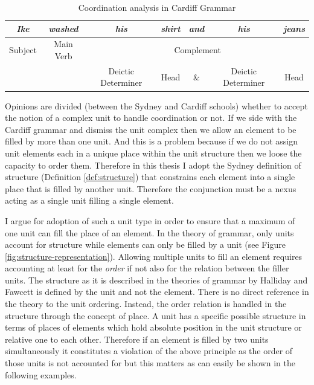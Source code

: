 \begin{table}[!ht]
	\centering
        \begin{tabular}{cc|c|c|c|c|c|}
            \hline
            \multicolumn{1}{|c|}{\textit{Ike}} & \textit{washed} & \textit{his}       & \textit{shirt} & \textit{and} & \textit{his}       & \textit{jeans} \\ \hline
            \multicolumn{1}{|c|}{Subject}      & Main Verb       & \multicolumn{5}{c|}{Complement}                                                          \\ \hline
             &  & Deictic Determiner & Head & \& & Deictic Determiner & Head \\ \cline{3-7} 
        \end{tabular}%
	\caption{Coordination analysis in Cardiff Grammar}
	\label{ex:Cardiff-example-analisys}
\end{table}

Opinions are divided (between the Sydney and Cardiff schools) whether to accept the notion of a complex unit to handle coordination or not. If we side with the Cardiff grammar and dismiss the unit complex then we allow an element to be filled by more than one unit. And this is a problem because if we do not assign unit elements each in a unique place within the unit structure then we loose the capacity to order them. Therefore in this thesis I adopt the Sydney definition of structure (Definition \ref{def:structure}) that constrains each element into a single place that is filled by another unit. Therefore the conjunction must be a nexus acting as a single unit filling a single element. 

I argue for adoption of such a unit type in order to ensure that a maximum of one unit can fill the place of an element. In the theory of grammar, only units account for structure while elements can only be filled by a unit (see Figure \ref{fig:structure-representation}). Allowing multiple units to fill an element requires accounting at least for the \textit{order} if not also for the relation between the filler units. The structure as it is described in the theories of grammar by Halliday \citep{Halliday2002} and Fawcett \citep{Fawcett2000} is defined by the unit and not the element. There is no direct reference in the theory to the unit ordering. Instead, the order relation is handled in the structure through the concept of place. A unit has a specific possible structure in terms of places of elements which hold absolute position in the unit structure or relative one to each other. Therefore if an element is filled by two units simultaneously it constitutes a violation of the above principle as the order of those units is not accounted for but this matters as can easily be shown in the following examples.

